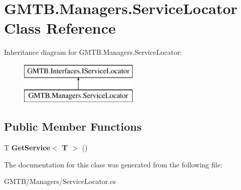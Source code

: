 \hypertarget{class_g_m_t_b_1_1_managers_1_1_service_locator}{}\section{G\+M\+T\+B.\+Managers.\+Service\+Locator Class Reference}
\label{class_g_m_t_b_1_1_managers_1_1_service_locator}
Inheritance diagram for G\+M\+T\+B.\+Managers.\+Service\+Locator\+:\begin{figure}[H]
\begin{center}
\leavevmode
\includegraphics[height=2.000000cm]{class_g_m_t_b_1_1_managers_1_1_service_locator}
\end{center}
\end{figure}
\subsection*{Public Member Functions}
\begin{DoxyCompactItemize}
\item 
\mbox{\label{class_g_m_t_b_1_1_managers_1_1_service_locator_ae1d96b4bcfaaad4b1008c312b46c9727}} 
T {\bfseries Get\+Service$<$ T $>$} ()
\end{DoxyCompactItemize}


The documentation for this class was generated from the following file\+:\begin{DoxyCompactItemize}
\item 
G\+M\+T\+B/\+Managers/Service\+Locator.\+cs\end{DoxyCompactItemize}
